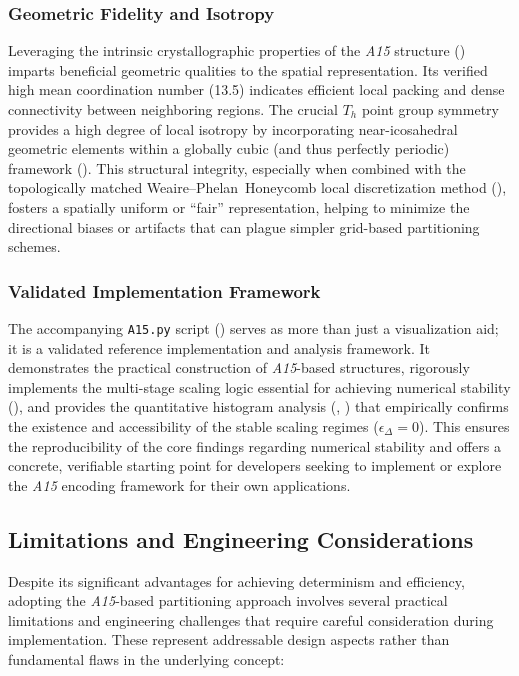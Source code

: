 \documentclass[10pt]{article}
\def\AAAB{\textit{A15}}
\def\WP{Weaire--Phelan}
\def\WPH{\WP{}~Honeycomb}
\begin{document}
\subsubsection{Geometric Fidelity and Isotropy}\label{subsubsec:benefits-geometry}
Leveraging the intrinsic crystallographic properties of the \AAAB{} structure () imparts beneficial geometric qualities to the spatial representation. Its verified high mean coordination number (13.5) indicates efficient local packing and dense connectivity between neighboring regions. The crucial $T_h$ point group symmetry provides a high degree of local isotropy by incorporating near-icosahedral geometric elements within a globally cubic (and thus perfectly periodic) framework (). This structural integrity, especially when combined with the topologically matched \WPH{} local discretization method (), fosters a spatially uniform or ``fair'' representation, helping to minimize the directional biases or artifacts that can plague simpler grid-based partitioning schemes.

\subsubsection{Validated Implementation Framework}\label{subsubsec:benefits-validation}
The accompanying \texttt{A15.py} script () serves as more than just a visualization aid; it is a validated reference implementation and analysis framework. It demonstrates the practical construction of \AAAB{}-based structures, rigorously implements the multi-stage scaling logic essential for achieving numerical stability (), and provides the quantitative histogram analysis (, ) that empirically confirms the existence and accessibility of the stable scaling regimes ($\epsilon_\Delta = 0$). This ensures the reproducibility of the core findings regarding numerical stability and offers a concrete, verifiable starting point for developers seeking to implement or explore the \AAAB{} encoding framework for their own applications.

\subsection{Limitations and Engineering Considerations}\label{subsec:discussion-limits}

Despite its significant advantages for achieving determinism and efficiency, adopting the \AAAB{}-based partitioning approach involves several practical limitations and engineering challenges that require careful consideration during implementation. These represent addressable design aspects rather than fundamental flaws in the underlying concept:
\end{document}
